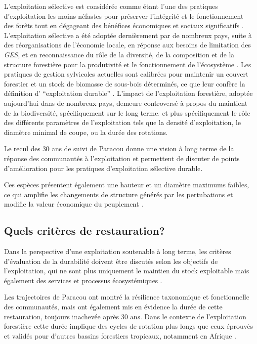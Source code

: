 \documentclass[
  11pt,
  french,
  A4paper,
  extrafontsizes,onecolumn,openright
  ]{memoir}
\begin{document}
L'exploitation sélective est considérée comme étant l'une des pratiques
d'exploitation les moins néfastes pour préserver l'intégrité et le
fonctionnement des forêts tout en dégageant des bénéfices économiques et
sociaux significatifs \autocite{Chaudhary2016}. L'exploitation sélective
a été adoptée dernièrement par de nombreux pays, suite à des
réorganisations de l'économie locale, en réponse aux besoins de
limitation des \emph{GES}, et en reconnaissance du rôle de la diversité,
de la composition et de la structure forestière pour la produtivité et
le fonctionnement de l'écosystème \autocite{Begon2006}. Les pratiques de
gestion sylvicoles actuelles sont calibrées pour maintenir un couvert
forestier et un stock de biomasse de sous-bois déterminés, ce que leur
confère la définition d' ``exploitation durable'' \autocite{ITTO2005}.
L'impact de l'exploitation forestière, adoptée aujourd'hui dans de
nombreux pays, demeure controversé à propos du maintient de la
biodiversité, spécifiquement sur le long terme. et plus spécifiquement
le rôle des différents paramètres de l'exploitation tels que la densité
d'exploitation, le diamètre minimal de coupe, ou la durée des rotations.

Le recul des 30 ans de suivi de Paracou donne une vision à long terme de
la réponse des communautés à l'exploitation et permettent de discuter de
points d'amélioration pour les pratiques d'exploitation sélective
durable.

Ces espèces présentent également une hauteur et un diamètre maximums
faibles, ce qui amplifie les changements de structure générés par les
pertubations et modifie la valeur économique du peuplement
\autocite{Rutishauser2016}.

\subsection{Quels critères de
restauration?}\label{quels-criteres-de-restauration}

Dans la perspective d'une exploitation soutenable à long terme, les
critères d'évaluation de la durabilité doivent être discutés selon les
objectifs de l'exploitation, qui ne sont plus uniquement le maintien du
stock exploitable mais également des services et processus
écosystémiques \autocites{ITTO2005}{Barlow2018}.

Les trajectoires de Paracou ont montré la résilience taxonomique et
fonctionnelle des communautés, mais ont également mis en évidence la
durée de cette restauration, toujours inachevée après 30 ans. Dans le
contexte de l'exploitation forestière cette durée implique des cycles de
rotation plus longs que ceux éprouvés et validés pour d'autres bassins
forestiers tropicaux, notamment en Afrique \autocite{Durrieu1998}.
\end{document}
